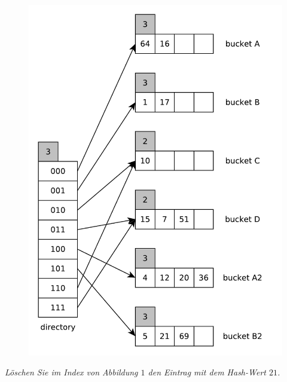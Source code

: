 \documentclass{uni_tue_template}
\begin{document}
  \begin{figure}[h!]
    \centering
    \includegraphics[scale=0.7]{graphml/01_3.pdf}
  \end{figure}
  \newpage
  \item \emph{Löschen Sie im Index von Abbildung $1$ den Eintrag mit dem Hash-Wert $21$.}
\end{document}
